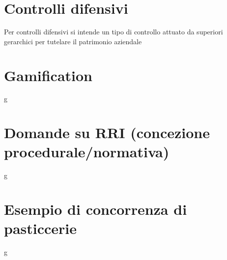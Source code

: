 \documentclass[8pt,oneside,a4paper]{article}
\begin{document}
	\section{Controlli difensivi}
	Per controlli difensivi si intende un tipo di controllo attuato da superiori gerarchici per tutelare il patrimonio aziendale
	\section{Gamification}
	g
	\section{Domande su RRI (concezione procedurale/normativa)}
	g
	\section{Esempio di concorrenza di pasticcerie}
	g
\end{document}
